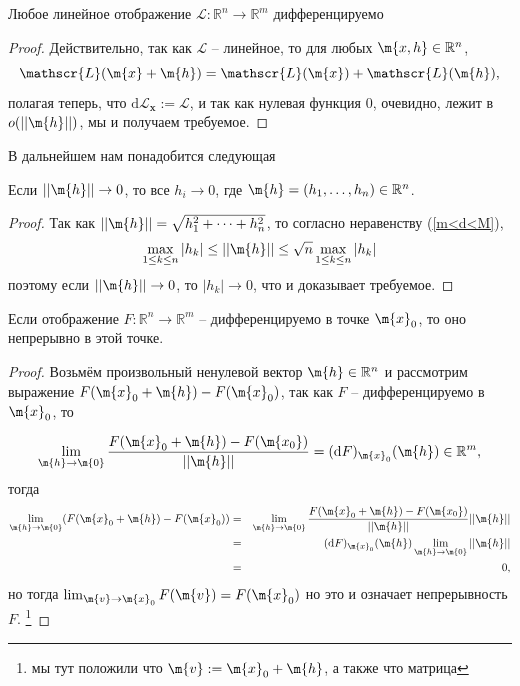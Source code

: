 \begin{lemma}
    Любое линейное отображение $\mathscr{L}: \mathbb{R}^n \to \mathbb{R}^m$ дифференцируемо
\end{lemma}
\begin{proof}
    Действительно, так как $\mathscr{L}$ -- линейное, то для любых $\m{x,h} \in \mathbb{R}^n$,
    \[
     \mathscr{L}(\m{x}+\m{h}) = \mathscr{L}(\m{x}) + \mathscr{L}(\m{h}),
    \]
    полагая теперь, что $\mathrm{d}\mathscr{L}_\mathbf{x}:=\mathscr{L}$, и так как нулевая функция $0$, очевидно, лежит в $o(||\m{h}||)$, мы и получаем требуемое.
\end{proof}

В дальнейшем нам понадобится следующая 
\begin{lemma}\label{||h||->0}
    Если $||\m{h}|| \to 0$, то все $h_i \to 0$, где $\m{h} = (h_1, \ldots, h_n) \in \mathbb{R}^n$.
\end{lemma}
\begin{proof}
    Так как $|| \m{h} || = \sqrt{h_1^2 + \cdots + h^2_n}$, то согласно неравенству (\ref{m<d<M}),
   \[
    \max_{1\le k \le n} |h_k| \le || \m{h} || \le \sqrt{n} \max_{1\le k \le n} |h_k|
   \] 
   поэтому если $||\m{h} || \to 0$, то $|h_k| \to 0$, что и доказывает требуемое.
\end{proof}


\begin{theorem}\label{diff=>contin}
    Если отображение $F: \mathbb{R}^n \to \mathbb{R}^m$ -- дифференцируемо в точке $\m{x}_0$, то оно непрерывно в этой точке.
\end{theorem}
\begin{proof}
Возьмём произвольный ненулевой вектор $\m{h} \in \mathbb{R}^n$ и рассмотрим выражение $F(\m{x}_0 + \m{h}) - F(\m{x}_0)$, так как $F$ -- дифференцируемо в $\m{x}_0$, то

\[
 \lim_{\m{h} \to \m{0}} \frac{F(\m{x}_0 + \m{h}) -  F(\m{x_0})}{|| \m{h} ||} = (\mathrm{d}F)_{\m{x}_0}(\m{h}) \in \mathbb{R}^m,
\]
тогда
\begin{eqnarray*}
    \lim_{\m{h} \to \m{0}}(   F(\m{x}_0 + \m{h}) - F(\m{x}_0)  ) &=& \lim_{\m{h} \to \m{0}} \frac{F(\m{x}_0 + \m{h}) -  F(\m{x_0})}{|| \m{h} ||} || \m{h}|| \\
    &=& (\mathrm{d}F)_{\m{x}_0}(\m{h}) \lim_{\m{h} \to \m{0}} || \m{h} || \\
    &=& 0,
\end{eqnarray*}
но тогда $\lim_{\m{v} \to \m{x}_0}F(\m{v}) = F(\m{x}_0)$ но это и означает непрерывность $F.$ \footnote{мы тут положили что $\m{v}: = \m{x}_0 +\m{h}$, а также что матрица }

\end{proof}


